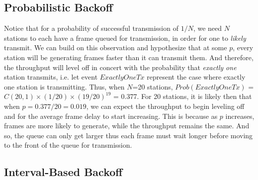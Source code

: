 \documentclass[twocolumn]{article}
\begin{document}
\subsection*{Probabilistic Backoff} Notice that for a probability of successful
transmission of $1/N$, we need $N$ stations to each have a frame queued for
transmission, in order for one to \emph{likely} transmit. We can build on this
observation and hypothesize that at some $p$, every station will be generating
frames faster than it can transmit them. And therefore, the throughput will
level off in concert with the probability that \emph{exactly one} station
transmits, i.e. let event $ExactlyOneTx$ represent the case where exactly one
station is transmitting. Thus, when $N$=20 stations, $Prob(ExactlyOneTx)$ =
$C(20,1)\times(1/20)\times(19/20)^{19}$ = 0.377. For 20 stations, it is likely
then that when $p=0.377/20=0.019$, we can expect the throughput to begin
leveling off and for the average frame delay to start increasing. This is
because as $p$ increases, frames are more likely to generate, while the
throughput remains the same. And so, the queue can only get larger thus each
frame must wait longer before moving to the front of the queue for transmission.

\subsection*{Interval-Based Backoff}



\end{document}
